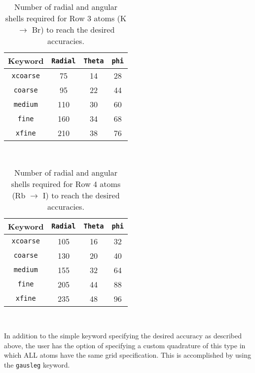 \begin{table}[h]
\begin{center}
\caption{Number of radial and angular shells required for Row 3 atoms
  (K $\rightarrow$ Br) to reach the desired accuracies.}

\vspace{.2in}

  \begin{tabular}[right]{|c|c|c|c|} \hline
Keyword & {\tt Radial} & {\tt Theta} & {\tt phi} \\ \hline
{\tt xcoarse} & 75 & 14 & 28  \\ \hline
{\tt coarse}  & 95 & 22 & 44  \\ \hline
{\tt medium}  &110 & 30 & 60  \\ \hline
{\tt fine}    &160 & 34 & 68  \\ \hline
{\tt xfine}   &210 & 38 & 76  \\ \hline
  \end{tabular} \\
\end{center}
\end{table}

\begin{table}[h]
\begin{center}
\caption{Number of radial and angular shells required for Row 4 atoms
  (Rb $\rightarrow$ I) to reach the desired accuracies.}

\vspace{.2in}

  \begin{tabular}[right]{|c|c|c|c|} \hline
Keyword & {\tt Radial} & {\tt Theta} & {\tt phi} \\ \hline
{\tt xcoarse} &105 & 16 & 32  \\ \hline
{\tt coarse}  &130 & 20 & 40  \\ \hline
{\tt medium}  &155 & 32 & 64  \\ \hline
{\tt fine}    &205 & 44 & 88  \\ \hline
{\tt xfine}   &235 & 48 & 96  \\ \hline
  \end{tabular} \\
\end{center}
\end{table}


In addition to the simple keyword specifying the desired accuracy as
described above, the user has the option of specifying a custom
quadrature of this type in which ALL atoms have the same grid
specification.  This is accomplished by using the \verb+gausleg+ keyword.

